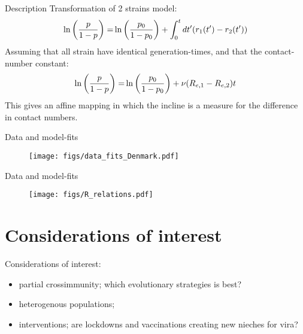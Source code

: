 \documentclass{beamer}
\begin{document}
\begin{frame}{Description}
Transformation of 2 strains model:
\begin{align*}
\ln \qty(\frac{p}{1-p}) =& \ln \qty(\frac{p_{0}}{1-p_{0}}) + \int_{0}^{t} \dd t' \qty(r_{1}(t') - r_{2}(t')) \\
\end{align*}
Assuming that all strain have identical generation-times, and that the contact-number constant:
\begin{align*}
\ln \qty(\frac{p}{1-p}) =& \ln \qty(\frac{p_{0}}{1-p_{0}}) + \nu \qty(R_{e, 1} - R_{e, 2}) t \\
\end{align*}
This gives an affine mapping in which the incline is a measure for the difference in contact numbers.
\end{frame}

\begin{frame}{Data and model-fits}
\begin{figure}[H]
\centering
\texttt{[image: figs/data\_fits\_Denmark.pdf]}
\end{figure}
\end{frame}

\begin{frame}{Data and model-fits}
\begin{figure}[H]
\centering
\texttt{[image: figs/R\_relations.pdf]}
\end{figure}
\end{frame}

\section{Considerations of interest}
\begin{frame}
Considerations of interest:
\begin{itemize}
\item<1-> partial crossimmunity; which evolutionary strategies is best?
\item<2-> heterogenous populations; \\
\item<3-> interventions; are lockdowns and vaccinations creating new nieches for vira?
\end{itemize}
\end{frame}

\begin{frame}%
\printbibliography
\end{frame}
\end{document}

